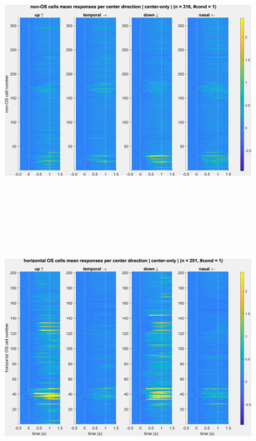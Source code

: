 \begin{figure}[H] \centering \includegraphics[width=11cm,height=11cm,keepaspectratio]{Figures/7.Results/population/sel/10_popPlots_nonOS_centerOnly.png} 
\end{figure}

\begin{figure}[H] \centering \includegraphics[width=11cm,height=11cm,keepaspectratio]{Figures/7.Results/population/sel/11_popPlots_horzOS_centerOnly.png} 
\end{figure}

